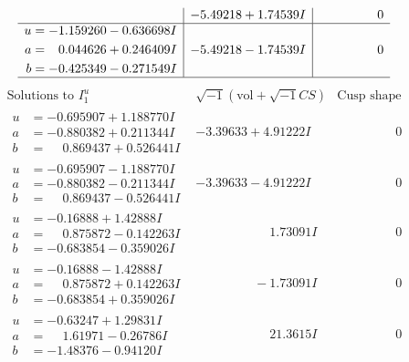 \documentclass[1p]{elsarticle_modified}
\theoremstyle{definition}
\newcommand{\I}{\sqrt{-1}}
\begin{document}
$$\begin{array}{c|c|c}
 & -5.49218 + 1.74539 I & \phantom{-0.000000 } 0 \\ \hline\begin{aligned}
u &= -1.159260 - 0.636698 I \\
a &= \phantom{-}0.044626 + 0.246409 I \\
b &= -0.425349 - 0.271549 I\end{aligned}
 & -5.49218 - 1.74539 I & \phantom{-0.000000 } 0\\
 \hline 
 \end{array}$$\newpage$$\begin{array}{c|c|c}  
\text{Solutions to }I^u_{1}& \I (\text{vol} + \sqrt{-1}CS) & \text{Cusp shape}\\
 \hline 
\begin{aligned}
u &= -0.695907 + 1.188770 I \\
a &= -0.880382 + 0.211344 I \\
b &= \phantom{-}0.869437 + 0.526441 I\end{aligned}
 & -3.39633 + 4.91222 I & \phantom{-0.000000 } 0 \\ \hline\begin{aligned}
u &= -0.695907 - 1.188770 I \\
a &= -0.880382 - 0.211344 I \\
b &= \phantom{-}0.869437 - 0.526441 I\end{aligned}
 & -3.39633 - 4.91222 I & \phantom{-0.000000 } 0 \\ \hline\begin{aligned}
u &= -0.16888 + 1.42888 I \\
a &= \phantom{-}0.875872 - 0.142263 I \\
b &= -0.683854 - 0.359026 I\end{aligned}
 & \phantom{-0.000000 -}1.73091 I & \phantom{-0.000000 } 0 \\ \hline\begin{aligned}
u &= -0.16888 - 1.42888 I \\
a &= \phantom{-}0.875872 + 0.142263 I \\
b &= -0.683854 + 0.359026 I\end{aligned}
 & \phantom{-0.000000 } -1.73091 I & \phantom{-0.000000 } 0 \\ \hline\begin{aligned}
u &= -0.63247 + 1.29831 I \\
a &= \phantom{-}1.61971 - 0.26786 I \\
b &= -1.48376 - 0.94120 I\end{aligned}
 & \phantom{-0.000000 -}21.3615 I & \phantom{-0.000000 } 0 \\ \hline\begin{aligned}

\end{aligned}
\end{array}$$
\end{document}
